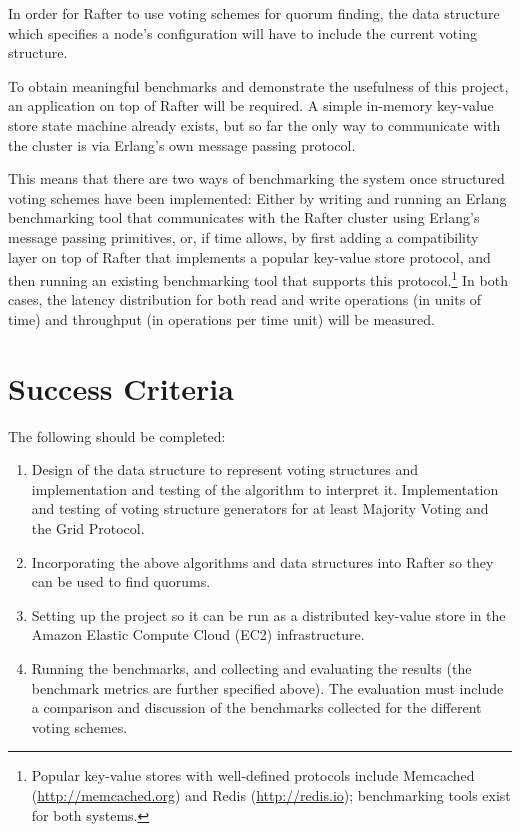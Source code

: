 \documentclass[12pt]{scrartcl}
\begin{document}
In order for Rafter to use voting schemes for quorum finding, the data structure which specifies a node's configuration will have to include the current voting structure.

To obtain meaningful benchmarks and demonstrate the usefulness of this project, an application on top of Rafter will be required. A simple in-memory key-value store state machine already exists, but so far the only way to communicate with the cluster is via Erlang's own message passing protocol.

This means that there are two ways of benchmarking the system once structured voting schemes have been implemented: Either by writing and running an Erlang benchmarking tool that communicates with the Rafter cluster using Erlang's message passing primitives, or, if time allows, by first adding a compatibility layer on top of Rafter that implements a popular key-value store protocol, and then running an existing benchmarking tool that supports this protocol.\footnote{Popular key-value stores with well-defined protocols include Memcached (\url{http://memcached.org}) and Redis (\url{http://redis.io}); benchmarking tools exist for both systems.} In both cases, the latency distribution for both read and write operations (in units of time) and throughput (in operations per time unit) will be measured.

\section{Success Criteria%
  \label{success-criteria}%
}

The following should be completed:

\begin{enumerate}

\item Design of the data structure to represent voting structures and implementation and testing of the algorithm to interpret it. Implementation and testing of voting structure generators for at least Majority Voting and the Grid Protocol.

\item Incorporating the above algorithms and data structures into Rafter so they can be used to find quorums.

\item Setting up the project so it can be run as a distributed key-value store in the Amazon Elastic Compute Cloud (\textsc{EC2}) infrastructure.

\item Running the benchmarks, and collecting and evaluating the results (the benchmark metrics are further specified above). The evaluation must include a comparison and discussion of the benchmarks collected for the different voting schemes.


\end{enumerate}
\end{document}
